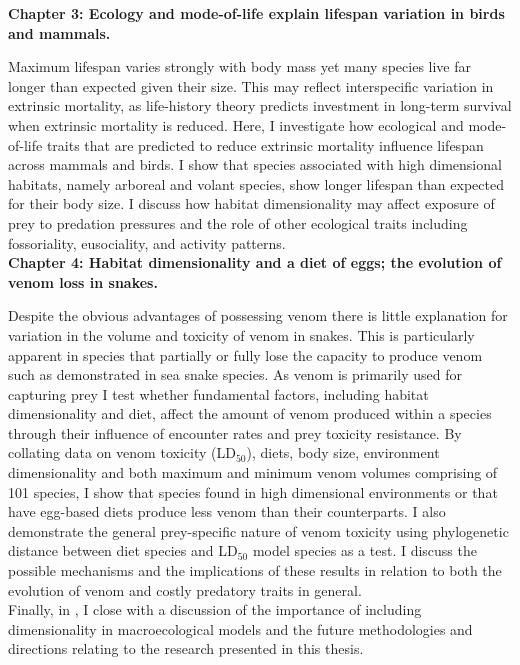 \textbf{Chapter 3: Ecology and mode-of-life explain lifespan variation in birds and mammals.}


Maximum lifespan varies strongly with body mass yet many species live far longer than expected given their size. This may reflect interspecific variation in extrinsic mortality, as life-history theory predicts investment in long-term survival when extrinsic mortality is reduced. Here, I investigate how ecological and mode-of-life traits that are predicted to reduce extrinsic mortality influence lifespan across mammals and birds. I show that species associated with high dimensional habitats, namely arboreal and volant species, show longer lifespan than expected for their body size. I discuss how habitat dimensionality may affect exposure of prey to predation pressures and the role of other ecological traits including fossoriality, eusociality, and activity patterns.\\




\textbf{Chapter 4: Habitat dimensionality and a diet of eggs; the evolution of venom loss in snakes.}


Despite the obvious advantages of possessing venom there is little explanation for variation in the volume and toxicity of venom in snakes. This is particularly apparent in species that partially or fully lose the capacity to produce venom such as demonstrated in sea snake species. As venom is primarily used for capturing prey I test whether fundamental factors, including habitat dimensionality and diet, affect the amount of venom produced within a species through their influence of encounter rates and prey toxicity resistance. By collating data on venom toxicity (LD$_{50}$), diets, body size, environment dimensionality and both maximum and minimum venom volumes comprising of 101 species, I show that species found in high dimensional environments or that have egg-based diets produce less venom than their counterparts. I also demonstrate the general prey-specific nature of venom toxicity using phylogenetic distance between diet species and LD$_{50}$ model species as a test. I discuss the possible mechanisms and the implications of these results in relation to both the evolution of venom and costly predatory traits in general.\\

%
%
Finally, in , I close with a discussion of the importance of including dimensionality in macroecological models and the future methodologies and directions relating to the research presented in this thesis.


